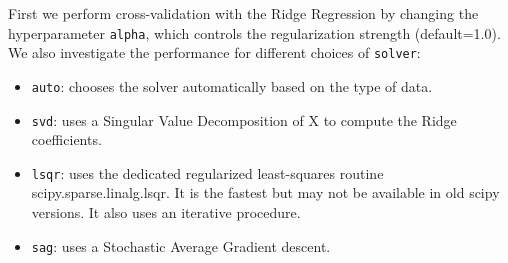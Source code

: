 \documentclass[11pt]{article}
\providecommand{\tightlist}{%
      \setlength{\itemsep}{0pt}\setlength{\parskip}{0pt}}
\begin{document}
{\hspace{0.5cm} First we perform cross-validation with the Ridge Regression by changing
the hyperparameter \texttt{alpha}, which controls the regularization
strength (default=1.0). We also investigate the performance for
different choices of \texttt{solver}:

\begin{itemize}
\tightlist
\item
  \texttt{auto}: chooses the solver automatically based on the type of
  data.
\item
  \texttt{svd}: uses a Singular Value Decomposition of X to compute the
  Ridge coefficients.
\item
  \texttt{lsqr}: uses the dedicated regularized least-squares routine
  scipy.sparse.linalg.lsqr. It is the fastest but may not be available
  in old scipy versions. It also uses an iterative procedure.
\item
  \texttt{sag}: uses a Stochastic Average Gradient descent.
\end{itemize}

}
\end{document}
